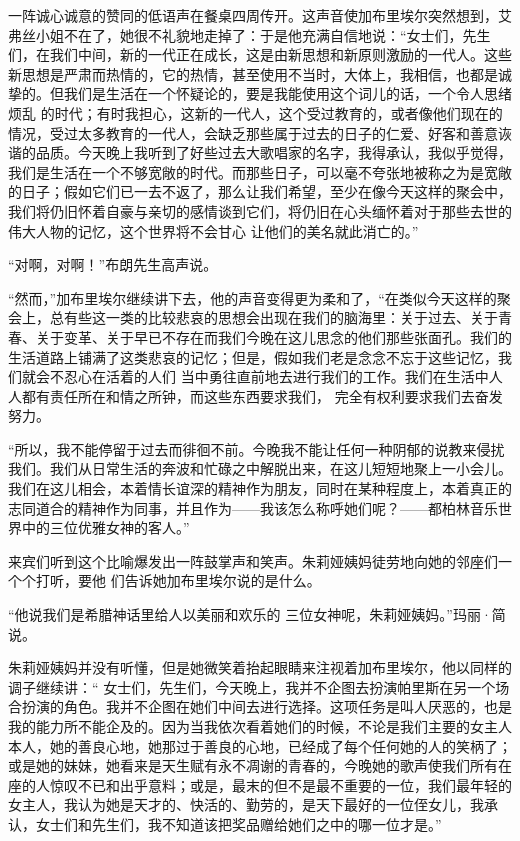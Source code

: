 \documentclass{article}
\begin{document}
一阵诚心诚意的赞同的低语声在餐桌四周传开。这声音使加布里埃尔突然想到，艾弗丝小姐不在了，她很不礼貌地走掉了：于是他充满自信地说：“女士们，先生们，在我们中间，新的一代正在成长，这是由新思想和新原则激励的一代人。这些新思想是严肃而热情的，它的热情，甚至使用不当时，大体上，我相信，也都是诚挚的。但我们是生活在一个怀疑论的，要是我能使用这个词儿的话，一个令人思绪烦乱
\newpage
的时代；有时我担心，这新的一代人，这个受过教育的，或者像他们现在的情况，受过太多教育的一代人，会缺乏那些属于过去的日子的仁爱、好客和善意诙谐的品质。今天晚上我听到了好些过去大歌唱家的名字，我得承认，我似乎觉得，我们是生活在一个不够宽敞的时代。而那些日子，可以毫不夸张地被称之为是宽敞的日子；假如它们已一去不返了，那么让我们希望，至少在像今天这样的聚会中，我们将仍旧怀着自豪与亲切的感情谈到它们，将仍旧在心头缅怀着对于那些去世的伟大人物的记忆，这个世界将不会甘心
让他们的美名就此消亡的。” 


“对啊，对啊！”布朗先生高声说。 

“然而，”加布里埃尔继续讲下去，他的声音变得更为柔和了，“在类似今天这样的聚会上，总有些这一类的比较悲哀的思想会出现在我们的脑海里：关于过去、关于青春、关于变革、关于早已不存在而我们今晚在这儿思念的他们那些张面孔。我们的生活道路上铺满了这类悲哀的记忆；但是，假如我们老是念念不忘于这些记忆，我们就会不忍心在活着的人们
\newpage
当中勇往直前地去进行我们的工作。我们在生活中人人都有责任所在和情之所钟，而这些东西要求我们，
完全有权利要求我们去奋发努力。 

“所以，我不能停留于过去而徘徊不前。今晚我不能让任何一种阴郁的说教来侵扰我们。我们从日常生活的奔波和忙碌之中解脱出来，在这儿短短地聚上一小会儿。我们在这儿相会，本着情长谊深的精神作为朋友，同时在某种程度上，本着真正的志同道合的精神作为同事，并且作为——我该怎么称呼她们呢？——都柏林音乐世界中的三位优雅女神的客人。”

来宾们听到这个比喻爆发出一阵鼓掌声和笑声。朱莉娅姨妈徒劳地向她的邻座们一个个打听，要他
们告诉她加布里埃尔说的是什么。 

“他说我们是希腊神话里给人以美丽和欢乐的
三位女神呢，朱莉娅姨妈。”玛丽·简说。 

朱莉娅姨妈并没有听懂，但是她微笑着抬起眼睛来注视着加布里埃尔，他以同样的调子继续讲：“
\newpage
女士们，先生们，今天晚上，我并不企图去扮演帕里斯在另一个场合扮演的角色。我并不企图在她们中间去进行选择。这项任务是叫人厌恶的，也是我的能力所不能企及的。因为当我依次看着她们的时候，不论是我们主要的女主人本人，她的善良心地，她那过于善良的心地，已经成了每个任何她的人的笑柄了；或是她的妹妹，她看来是天生赋有永不凋谢的青春的，今晚她的歌声使我们所有在座的人惊叹不已和出乎意料；或是，最末的但不是最不重要的一位，我们最年轻的女主人，我认为她是天才的、快活的、勤劳的，是天下最好的一位侄女儿，我承认，女士们和先生们，我不知道该把奖品赠给她们之中的哪一位才是。”
\end{document}
